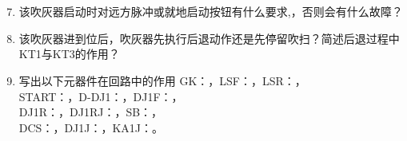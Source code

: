 \documentclass{book}
\begin{document}
\section{}
\begin{enumerate}
	\setcounter{enumi}{6}
	\item 该吹灰器启动时对远方脉冲或就地启动按钮有什么要求,，否则会有什么故障？
	\item 该吹灰器进到位后，吹灰器先执行后退动作还是先停留吹扫？简述后退过程中KT1与KT3的作用？
	\item 写出以下元器件在回路中的作用
GK：，LSF：，LSR：，\\START：，D-DJ1：，DJ1F：，\\DJ1R：，DJ1RJ：，SB：，\\DCS：，DJ1J：，KA1J：。
\end{enumerate}
\end{document}
